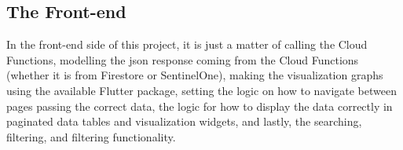 
\subsection{The Front-end}

In the front-end side of this project, it is just a matter of calling the Cloud Functions, modelling the \acrshort{json} response
coming from the Cloud Functions (whether it is from Firestore or SentinelOne), making the visualization graphs using the available
Flutter package, setting the logic on how to navigate between pages passing the correct data, the logic for how to display the data
correctly in paginated data tables and visualization widgets, and lastly, the searching, filtering, and filtering functionality.








